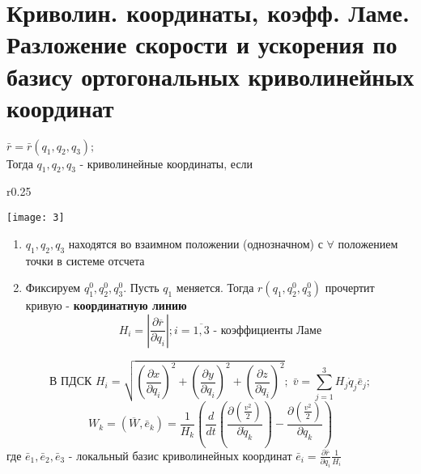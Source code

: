 \documentclass[12pt]{article}
\begin{document}
\section{Криволин. координаты, коэфф. Ламе.   Разложение скорости и ускорения по базису ортогональных криволинейных координат}
	$\bar{r}=\bar{r}(q_1, q_2, q_3); $\\
	Тогда \textbf{ $q_1, q_2, q_3$} - криволинейные координаты, если \\
	\begin{wrapfigure}{r}{0.25\textwidth}
		\vspace{-80pt}
		\begin{center}
			\texttt{[image: 3]}
		\end{center}
		\vspace{-40pt}
	\end{wrapfigure} 
	\begin{enumerate}
		\item $q_1, q_2, q_3$ находятся во взаимном положении (однозначном) с $\forall$ положением точки в системе отсчета
		\item Фиксируем $q_1^0, q_2^0, q_3^0$. Пусть $q_1$ меняется. Тогда $r(q_1, q_2^0, q_3^0)$ прочертит кривую - \textbf{координатную линию}
		$$ H_i=\left| \frac{\partial\overline{r}}{\partial q_i} \right|; i=\overline{1,3} \text{ - коэффициенты Ламе}$$
	 \vspace{-20pt}	
	\end{enumerate}
	 $$\text{В ПДСК  } H_i=\sqrt{ \left(\frac{\partial x }{\partial q_i}\right)^2  +  \left(\frac{\partial y }{\partial q_i}\right)^2 + \left(\frac{\partial z }{\partial q_i}\right)^2 }; \; 
	\bar{v}=\sum\limits_{j=1}^3 H_j\dot{q}_j\bar{e}_j;$$
	$$W_k=(\overline{W}, \bar{e}_k) = \frac{1}{H_k} \left(\frac{d}{dt} \left(\frac{\partial (\frac{v^2}{2})}{\partial \dot{q}_k}\right) - \frac{\partial (\frac{v^2}{2})}{\partial q_k} \right)$$
	где $\bar{e}_1, \bar{e}_2, \bar{e}_3 $ - локальный базис криволинейных координат $\bar{e}_i=\frac{\partial \bar{r}}{\partial q_i}\frac{1}{H_i}$
	\vspace{-10pt}
\end{document}
